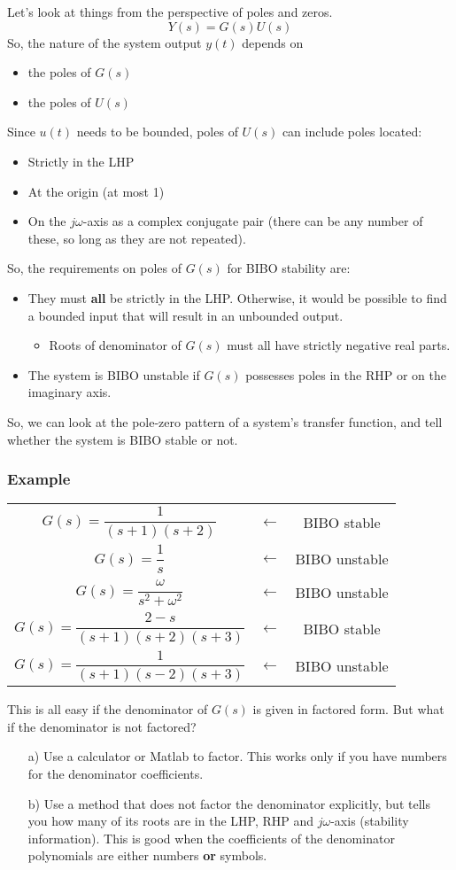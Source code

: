 \documentclass{book}
\newcommand{\jw}{j\omega}
\newcommand{\exmp}{\subsubsection*{Example}}
\begin{document}
Let's look at things from the perspective of poles and zeros.
\[ Y(s)=G(s)U(s) \]
So, the nature of the system output $ y(t) $ depends on
\begin{itemize}
	\item the poles of $ G(s) $
	\item the poles of $ U(s) $
\end{itemize}
Since $ u(t) $ needs to be bounded, poles of $ U(s) $ can include poles located:
\begin{itemize}
	\item Strictly in the LHP
	\item At the origin (at most 1)
	\item On the $ \jw $-axis as a complex conjugate pair (there can be any number of these, so long as they are not repeated).
\end{itemize}
So, the requirements on poles of $ G(s) $ for BIBO stability are:
\begin{itemize}
	\item They must \textbf{all} be strictly in the LHP. Otherwise, it would be possible to find a bounded input that will result in an unbounded output.
	\begin{itemize}
		\item Roots of denominator of $ G(s) $ must all have strictly negative real parts.
	\end{itemize}
	\item The system is BIBO unstable if $ G(s) $ possesses poles in the RHP or on the imaginary axis.
\end{itemize}
So, we can look at the pole-zero pattern of a system's transfer function, and tell whether the system is BIBO stable or not.

\exmp
\begin{center}
	\begin{tabular}{c c c}
		$ G(s) = \dfrac{1}{(s+1)(s+2)} $ & $ \longleftarrow $ & BIBO stable \\
		$ G(s) = \dfrac{1}{s} $ & $ \longleftarrow $ & BIBO unstable \\
		$ G(s) = \dfrac{\omega}{s^2+\omega^2} $ & $ \longleftarrow $ & BIBO unstable \\
		$ G(s) = \dfrac{2-s}{(s+1)(s+2)(s+3)} $ & $ \longleftarrow $ & BIBO stable \\
		$ G(s) = \dfrac{1}{(s+1)(s-2)(s+3)} $ & $ \longleftarrow $ & BIBO unstable \\
	\end{tabular}
\end{center}
This is all easy if the denominator of $ G(s) $ is given in factored form. But what if the denominator is not factored?
\begin{itemize}
	\item[a)] Use a calculator or Matlab to factor. This works only if you have numbers for the denominator coefficients.
	\item[b)] Use a method that does not factor the denominator explicitly, but tells you how many of its roots are in the LHP, RHP and $ \jw $-axis (stability information). This is good when the coefficients of the denominator polynomials are either numbers \textbf{or} symbols.
\end{itemize}
\end{document}
